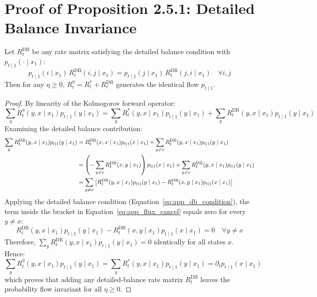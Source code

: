 \section{Proof of Proposition 2.5.1: Detailed Balance Invariance}

\begin{pro}
Let $R_t^{\text{DB}}$ be any rate matrix satisfying the detailed balance condition with $p_{t \mid 1}(\cdot \mid x_1)$:
\begin{equation}
p_{t \mid 1}(i \mid x_1) \, R_t^{\text{DB}}(i, j \mid x_1) = p_{t \mid 1}(j \mid x_1) \, R_t^{\text{DB}}(j, i \mid x_1) \quad \forall i, j
\label{eq:app_db_condition}
\end{equation}
Then for any $\eta \ge 0$, $R_t^\eta = R_t^* + R_t^{\text{DB}}$ generates the identical flow $p_{t \mid 1}$.
\end{pro}

\begin{proof}
By linearity of the Kolmogorov forward operator:
\begin{equation}
\sum_y R_t^\eta(y, x \mid x_1) p_{t \mid 1}(y \mid x_1) = \sum_y R_t^*(y, x \mid x_1) p_{t \mid 1}(y \mid x_1) + \sum_y R_t^{\text{DB}}(y, x \mid x_1) p_{t \mid 1}(y \mid x_1)
\end{equation}
Examining the detailed balance contribution:
\begin{align}
\sum_y R_t^{\text{DB}}(y, x \mid x_1) p_{t \mid 1}(y \mid x_1) &= R_t^{\text{DB}}(x, x \mid x_1) p_{t \mid 1}(x \mid x_1) + \sum_{y \ne x} R_t^{\text{DB}}(y, x \mid x_1) p_{t \mid 1}(y \mid x_1) \notag \\
&= \left( -\sum_{y \ne x} R_t^{\text{DB}}(x, y \mid x_1) \right) p_{t \mid 1}(x \mid x_1) + \sum_{y \ne x} R_t^{\text{DB}}(y, x \mid x_1) p_{t \mid 1}(y \mid x_1) \notag \\
&= \sum_{y \ne x} \left[ R_t^{\text{DB}}(y, x \mid x_1) p_{t \mid 1}(y \mid x_1) - R_t^{\text{DB}}(x, y \mid x_1) p_{t \mid 1}(x \mid x_1) \right] \label{eq:app_flux_cancel}
\end{align}
Applying the detailed balance condition (Equation~\ref{eq:app_db_condition}), the term inside the bracket in Equation~\ref{eq:app_flux_cancel} equals zero for every $y \ne x$:
\begin{equation}
R_t^{\text{DB}}(y, x \mid x_1) p_{t \mid 1}(y \mid x_1) - R_t^{\text{DB}}(x, y \mid x_1) p_{t \mid 1}(x \mid x_1) = 0 \quad \forall y \ne x
\end{equation}
Therefore, $\sum_y R_t^{\text{DB}}(y, x \mid x_1) p_{t \mid 1}(y \mid x_1) = 0$ identically for all states $x$. Hence:
\begin{equation}
\sum_y R_t^\eta(y, x \mid x_1) p_{t \mid 1}(y \mid x_1) = \sum_y R_t^*(y, x \mid x_1) p_{t \mid 1}(y \mid x_1) = \partial_t p_{t \mid 1}(x \mid x_1)
\end{equation}
which proves that adding any detailed-balance rate matrix $R_t^{\text{DB}}$ leaves the probability flow invariant for all $\eta \ge 0$.
\end{proof}

